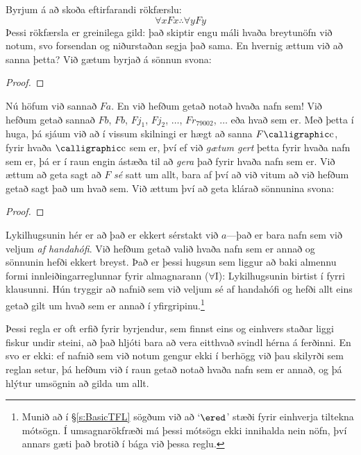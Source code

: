 Byrjum á að skoða eftirfarandi rökfærslu: $$\forall x Fx \therefore \forall y Fy$$ Þessi rökfærsla er greinilega gild: það skiptir engu máli hvaða breytunöfn við notum, svo forsendan og niðurstaðan segja það sama. En hvernig ættum við að sanna þetta? Við gætum byrjað á sönnun svona:
\begin{proof}
	 
\end{proof}
Nú höfum við sannað $Fa$. En við hefðum getað notað hvaða nafn sem! Við hefðum getað sannað $Fb$, $Fb$, $Fj_1$, $Fj_2$, $\ldots$, $Fr_{79002}$, $\ldots$ eða hvað sem er. Með þetta í huga, þá sjáum við að í vissum skilningi er hægt að sanna $F\meta{c}$, fyrir hvaða $\meta{c}$ sem er, því ef við \emph{gætum gert} þetta fyrir hvaða nafn sem er, þá er í raun engin ástæða til að \emph{gera} það fyrir hvaða nafn sem er. Við ættum að geta sagt að $F$ \emph{sé} satt um allt, bara af því að við vitum að við hefðum getað sagt það um hvað sem. Við ættum því að geta klárað sönnunina svona:
\begin{proof}
	 
	 
\end{proof}
Lykilhugsunin hér er að það er ekkert sérstakt við $a$---það er bara nafn sem við veljum \emph{af handahófi}. Við hefðum getað valið hvaða nafn sem er annað og sönnunin hefði ekkert breyst. Það er þessi hugsun sem liggur að baki almennu formi innleiðingarreglunnar fyrir almagnarann ($\forall$I):
Lykilhugsunin birtist í fyrri klausunni. Hún tryggir að nafnið sem við veljum sé af handahófi og hefði allt eins getað gilt um hvað sem er annað í yfirgripinu.\footnote{Munið að í \S\ref{s:BasicTFL} sögðum við að `$\ered$' stæði fyrir einhverja tiltekna mótsögn. Í umsagnarökfræði má þessi mótsögn ekki innihalda nein nöfn, því annars gæti það brotið í bága við þessa reglu.} 

Þessi regla er oft erfið fyrir byrjendur, sem finnst eins og einhvers staðar liggi fiskur undir steini, að það hljóti bara að vera eitthvað svindl hérna á ferðinni. En svo er ekki: ef nafnið sem við notum gengur ekki í berhögg við þau skilyrði sem reglan setur, þá hefðum við í raun getað notað hvaða nafn sem er annað, og þá hlýtur umsögnin að gilda um allt. 

